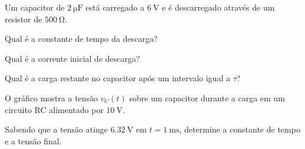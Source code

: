 \blocoaprofundamento
\begin{questao}[3]{}

Um capacitor de $\SI{2}{\micro\farad}$ está carregado a $\SI{6}{\volt}$ e é
descarregado através de um resistor de $\SI{500}{\ohm}$.
\begin{itensq}
\item Qual é a constante de tempo da descarga?
\item Qual é a corrente inicial de descarga?
\item Qual é a carga restante no capacitor após um intervalo igual a $\tau$?
\end{itensq}


\end{questao}
\begin{questao}[3]{}

O gráfico mostra a tensão $v_C(t)$ sobre um capacitor durante a carga em um
circuito RC alimentado por $\SI{10}{\volt}$.


Sabendo que a tensão atinge $\SI{6.32}{\volt}$ em $t = \SI{1}{\milli\second}$,
determine a constante de tempo e a tensão final.


\end{questao}
